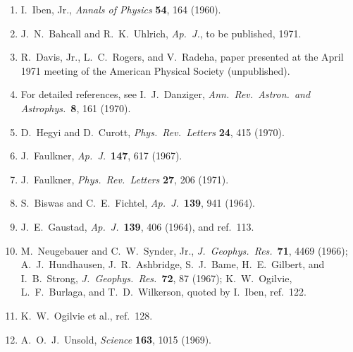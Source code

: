 \begin{enumerate}
  \item{}\label{ch15-ref-122}
  I.~Iben, Jr., \emph{Annals of Physics} \textbf{54}, 164 (1960).

  \item[122a.]\label{ch15-ref-122a}
  J.~N.~Bahcall and R.~K.~Uhlrich,
  \emph{Ap.\ J.}, to be published, 1971.

  \item[122b.]\label{ch15-ref-122b}
  R.~Davis, Jr., L.~C.~Rogers, and V.~Radeha, paper presented at the
  April 1971 meeting of the American Physical Society (unpublished).

  \item{}\label{ch15-ref-123}
  For detailed references, see I.~J.~Danziger,
  \emph{Ann.\ Rev.\ Astron.\ and Astrophys.}\ \textbf{8}, 161 (1970).

  \item{}\label{ch15-ref-124}
  D.~Hegyi and D.~Curott,
  \emph{Phys.\ Rev.\ Letters} \textbf{24}, 415 (1970).

  \item{}\label{ch15-ref-125}
  J.~Faulkner, \emph{Ap.\ J.}\ \textbf{147}, 617 (1967).

  \item[125a.]\label{ch15-ref-125a}
  J.~Faulkner, \emph{Phys.\ Rev.\ Letters} \textbf{27}, 206 (1971).

  \item{}\label{ch15-ref-126}
  S.~Biswas and C.~E.~Fichtel,
  \emph{Ap.\ J.}\ \textbf{139}, 941 (1964).

  \item{}\label{ch15-ref-127}
  J.~E.~Gaustad, \emph{Ap.\ J.}\ \textbf{139}, 406 (1964), and ref.~113.

  \item{}\label{ch15-ref-128}
  M.~Neugebauer and C.~W.~Synder, Jr.,
  \emph{J.\ Geophys.\ Res.}\ \textbf{71}, 4469 (1966);
  A.~J.~Hundhausen, J.~R.~Ashbridge, S.~J.~Bame, H.~E.~Gilbert,
  and I.~B.~Strong, \emph{J.\ Geophys.\ Res.}\ \textbf{72}, 87 (1967);
  K.~W.~Ogilvie, L.~F.~Burlaga, and T.~D.~Wilkerson,
  quoted by I.~Iben, ref.~122.

  \item{}\label{ch15-ref-129}
  K.~W.~Ogilvie et al., ref.~128.

  \item{}\label{ch15-ref-130}
  A.~O.~J.~Unsold, \emph{Science} \textbf{163}, 1015 (1969).


\end{enumerate}

